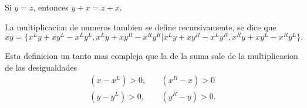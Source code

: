     \begin{corollary}
        Si $y=z$, entonces $y+x=z+x$.
    \end{corollary}

    La multiplicacion de numeros tambien se define recursivamente, se dice que
    \[
        xy = \{x^Ly+xy^L-x^Ly^L, x^Ly+xy^R-x^Ry^R| x^Ly+xy^R-x^Ly^R, x^Ry+xy^L-x^Ry^L\}.
    \]

    Esta definicion un tanto mas compleja que la de la suma sale de la multiplicacion de las desigualdades
    \begin{align*}
        (x-x^L) > 0, \quad & (x^R-x)>0 \\
        (y-y^L) > 0, \quad & (y^R-y)>0.
    \end{align*}